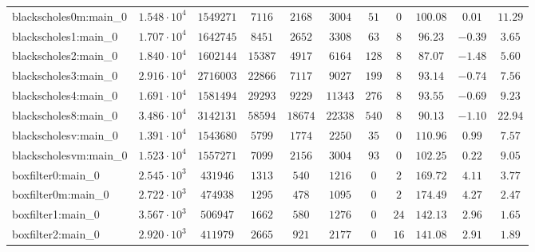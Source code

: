 \begin{tabular}{|l|c|c|c|c|c|c|c|c|c|c|}
blackscholes0m:main\_0         & $ 1.548 \cdot 10^{4} $ & $ 1549271  $ & $ 7116   $ & $ 2168   $ & $ 3004   $ & $ 51   $ & $ 0    $ & $ 100.08      $ & $ 0.01    $ & $ 11.29   $ \\
blackscholes1:main\_0          & $ 1.707 \cdot 10^{4} $ & $ 1642745  $ & $ 8451   $ & $ 2652   $ & $ 3308   $ & $ 63   $ & $ 8    $ & $ 96.23       $ & $ -0.39   $ & $ 3.65    $ \\
blackscholes2:main\_0          & $ 1.840 \cdot 10^{4} $ & $ 1602144  $ & $ 15387  $ & $ 4917   $ & $ 6164   $ & $ 128  $ & $ 8    $ & $ 87.07       $ & $ -1.48   $ & $ 5.60    $ \\
blackscholes3:main\_0          & $ 2.916 \cdot 10^{4} $ & $ 2716003  $ & $ 22866  $ & $ 7117   $ & $ 9027   $ & $ 199  $ & $ 8    $ & $ 93.14       $ & $ -0.74   $ & $ 7.56    $ \\
blackscholes4:main\_0          & $ 1.691 \cdot 10^{4} $ & $ 1581494  $ & $ 29293  $ & $ 9229   $ & $ 11343  $ & $ 276  $ & $ 8    $ & $ 93.55       $ & $ -0.69   $ & $ 9.23    $ \\
blackscholes8:main\_0          & $ 3.486 \cdot 10^{4} $ & $ 3142131  $ & $ 58594  $ & $ 18674  $ & $ 22338  $ & $ 540  $ & $ 8    $ & $ 90.13       $ & $ -1.10   $ & $ 22.94   $ \\
blackscholesv:main\_0          & $ 1.391 \cdot 10^{4} $ & $ 1543680  $ & $ 5799   $ & $ 1774   $ & $ 2250   $ & $ 35   $ & $ 0    $ & $ 110.96      $ & $ 0.99    $ & $ 7.57    $ \\
blackscholesvm:main\_0         & $ 1.523 \cdot 10^{4} $ & $ 1557271  $ & $ 7099   $ & $ 2156   $ & $ 3004   $ & $ 93   $ & $ 0    $ & $ 102.25      $ & $ 0.22    $ & $ 9.05    $ \\
boxfilter0:main\_0             & $ 2.545 \cdot 10^{3} $ & $ 431946   $ & $ 1313   $ & $ 540    $ & $ 1216   $ & $ 0    $ & $ 2    $ & $ 169.72      $ & $ 4.11    $ & $ 3.77    $ \\
boxfilter0m:main\_0            & $ 2.722 \cdot 10^{3} $ & $ 474938   $ & $ 1295   $ & $ 478    $ & $ 1095   $ & $ 0    $ & $ 2    $ & $ 174.49      $ & $ 4.27    $ & $ 2.47    $ \\
boxfilter1:main\_0             & $ 3.567 \cdot 10^{3} $ & $ 506947   $ & $ 1662   $ & $ 580    $ & $ 1276   $ & $ 0    $ & $ 24   $ & $ 142.13      $ & $ 2.96    $ & $ 1.65    $ \\
boxfilter2:main\_0             & $ 2.920 \cdot 10^{3} $ & $ 411979   $ & $ 2665   $ & $ 921    $ & $ 2177   $ & $ 0    $ & $ 16   $ & $ 141.08      $ & $ 2.91    $ & $ 1.89    $ \\

\end{tabular}
